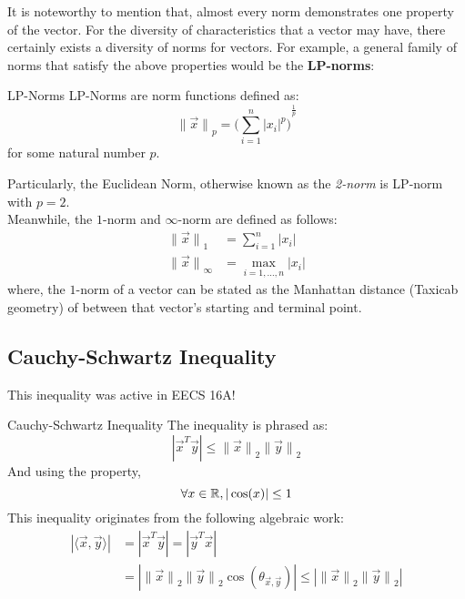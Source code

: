It is noteworthy to mention that, almost every norm demonstrates one property of the vector.
For the diversity of characteristics that a vector may have, there certainly exists a diversity of norms for vectors.
For example, a general family of norms that satisfy the above properties would be the \textbf{LP-norms}:
\begin{ln-define}{LP-Norms}{}
    LP-Norms are norm functions defined as:
    \[
        {\lVert \vec{x} \rVert}_p = {\bigg( \sum_{i = 1}^n |x_i|^p \bigg)}^{\frac{1}{p}}
    \]
    for some natural number $p$. \\
\end{ln-define}
Particularly, the Euclidean Norm, otherwise known as the \textit{2-norm} is LP-norm with $p = 2$. \\
Meanwhile, the $1$-norm and $\infty$-norm are defined as follows:
\begin{align*}
    {\lVert \vec{x} \rVert}_1 &= \sum_{i = 1}^n |x_i| \\
    {\lVert \vec{x} \rVert}_\infty &= \max_{i = 1, \dots, n} |x_i|
\end{align*}
where, the $1$-norm of a vector can be stated as the Manhattan distance (Taxicab geometry) of between that vector's starting and terminal point.

\subsection{Cauchy-Schwartz Inequality}
This inequality was active in EECS 16A!
\begin{ln-define}{Cauchy-Schwartz Inequality}{}
    The inequality is phrased as:
    \[
        |\vec{x}^T \vec{y}| \leq {\lVert \vec{x} \rVert}_2 {\lVert \vec{y} \rVert}_2
    \]
    And using the property,
    \[\forall x \in \mathbb{R}, |\cos(x)| \leq 1\]
    \tcblower
    This inequality originates from the following algebraic work:
    \begin{align*}
        |\langle \vec{x}, \vec{y} \rangle| &= |\vec{x}^T \vec{y}| = |\vec{y}^T \vec{x}| \\
        &= |{\lVert \vec{x} \rVert}_2 {\lVert \vec{y} \rVert}_2 \cos(\theta_{\vec{x}, \vec{y}})|
        \leq |{\lVert \vec{x} \rVert}_2 {\lVert \vec{y} \rVert}_2|
    \end{align*}
\end{ln-define}

